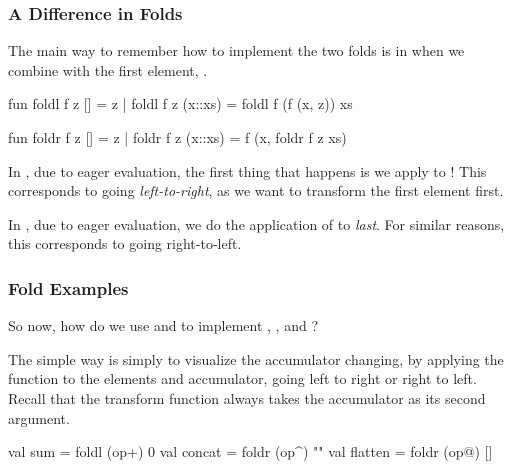 \documentclass[aspectratio=169, handout]{beamer}
\begin{document}
\begin{frame}[fragile]
  \frametitle{A Difference in Folds}

  The main way to remember how to implement the two folds is in when we
  combine with the first element, .

  \pause
  \vspace{\fill}

  \begin{codeblock}
    fun foldl f z [] = z
      | foldl f z (x::xs) = foldl f (f (x, z)) xs

    fun foldr f z [] = z
      | foldr f z (x::xs) = f (x, foldr f z xs)
  \end{codeblock}

  \pause
  \vspace{\fill}

  In , due to eager evaluation, the first thing that happens is we
  apply  to ! This corresponds to going \textit{left-to-right},
  as we want to transform the first element first.

  \pause
  \vspace{\fill}

  In , due to eager evaluation, we do the application of 
  to  \textit{last}. For similar reasons, this corresponds to going
  right-to-left.
\end{frame}

\begin{frame}[fragile]
  \frametitle{Fold Examples}

  So now, how do we use  and  to implement
  , , and ?

  \pause
  \vspace{\fill}

  The simple way is simply to visualize the accumulator changing, by
  applying the function to the elements and accumulator, going left to
  right or right to left. Recall that the transform function 
  always takes the accumulator as its second argument.

  \pause
  \vspace{\fill}

  \begin{codeblock}
    val sum = foldl (op+) 0
    val concat = foldr (op^) ""
    val flatten = foldr (op@) []
  \end{codeblock}
\end{frame}
\end{document}
